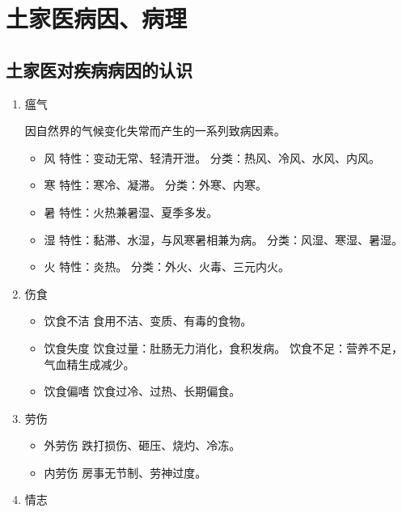 \documentclass[cn,blue,12pt,normal,founder]{elegantnote}
\begin{document}
\section{土家医病因、病理}

\subsection{土家医对疾病病因的认识}

\begin{enumerate}
  \item 瘟气

  因自然界的气候变化失常而产生的一系列致病因素。

  \begin{itemize}
    \item 风
    \subitem 特性：变动无常、轻清开泄。
    \subitem 分类：热风、冷风、水风、内风。

    \item 寒
    \subitem 特性：寒冷、凝滞。
    \subitem 分类：外寒、内寒。
    \item 暑
    \subitem 特性：火热兼暑湿、夏季多发。
    \item 湿
    \subitem 特性：黏滞、水湿，与风寒暑相兼为病。
    \subitem 分类：风湿、寒湿、暑湿。
    \item 火
    \subitem 特性：炎热。
    \subitem 分类：外火、火毒、三元内火。
  \end{itemize}

  \item 伤食

  \begin{itemize}
    \item 饮食不洁
    \subitem 食用不洁、变质、有毒的食物。
    \item 饮食失度
    \subitem 饮食过量：肚肠无力消化，食积发病。
    \subitem 饮食不足：营养不足，气血精生成减少。
    \item 饮食偏嗜
    \subitem 饮食过冷、过热、长期偏食。
  \end{itemize}

  \item 劳伤

  \begin{itemize}
    \item 外劳伤
    \subitem 跌打损伤、砸压、烧灼、冷冻。
    \item 内劳伤
    \subitem 房事无节制、劳神过度。
  \end{itemize}

  \item 情志


\end{enumerate}
\end{document}
